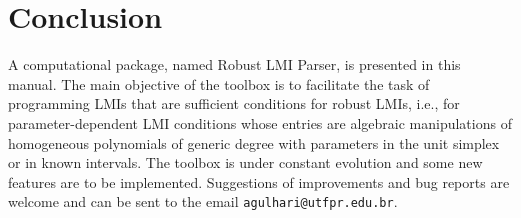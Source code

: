 \documentclass[english,11pt]{article}
\theoremstyle{break} \theorembodyfont{\small\rm}
\begin{document}
\section{Conclusion}\label{sec_conclusion}
A computational package, named Robust LMI Parser, is presented in this
manual. The main objective of the toolbox is to facilitate the task of programming 
LMIs that are sufficient conditions for robust LMIs, i.e., for parameter-dependent LMI
conditions whose entries are algebraic manipulations of homogeneous polynomials 
of generic degree with parameters in the unit simplex or in known intervals. 
The toolbox
is under constant evolution and some new features are to be implemented. Suggestions
of improvements and bug reports are welcome and can be sent to the email {\tt agulhari@utfpr.edu.br}.


% 





%


%
\end{document}
